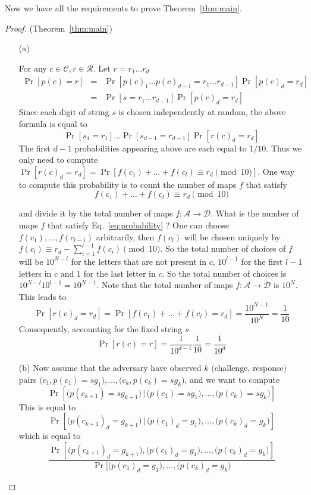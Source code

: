 \documentclass[anon,12pt]{colt2016}
\begin{document}
Now we have all the requirements to prove Theorem~\ref{thm:main}.
\begin{proof}(Theorem~\ref{thm:main})


\begin{itemize}
	\item[(a)]

 For any $c\in\mathcal{C}, r\in\mathcal{R}$. Let $r=r_1\ldots r_d$
	$$
	\begin{array}{lcl}
		\Pr[p(c)=r] & = &
		\Pr[p(c)_1\ldots p(c)_{d-1}=r_1\ldots r_{d-1}]\Pr[p(c)_d=r_d] \\
		& =&
	 \Pr[s=r_1\ldots r_{d-1}]\Pr[p(c)_d=r_d]
	\end{array}
	$$
	Since each digit of string $s$ is chosen independently at random, the above formula is equal to
	$$
	\Pr[s_1=r_1]\ldots \Pr[s_{d-1}=r_{d-1}]\Pr[r(c)_d=r_d]
	$$
	 The first $d-1$ probabilities appearing above are each equal to $1/10$. Thus we only need to compute $\Pr[r(c)_d=r_d]= 
	        \Pr[f(c_1)+\ldots+f(c_{l})\equiv r_d \pmod{10} ]$. One way to compute this probability is to count the number of maps $f$ that satisfy 
	\begin{equation}
		\label{eq:probability}
	        f(c_1)+\ldots+f(c_{l})\equiv r_d \pmod{10}	
	    \end{equation}

	  and divide it by the total number of maps $f:\mathcal{A}\to \mathcal{D}$. What is the number of maps $f$ that satisfy Eq.~\ref{eq:probability} ? One can choose $f(c_1),\ldots ,f(c_{l-1})$ arbitrarily, then $f(c_l)$ will be chosen uniquely by $f(c_l)\equiv r_d-\sum_{i=1}^{l-1}f(c_i)\pmod{10}$. So the total number of choices of $f$ will be $10^{N-{l}}$ for the letters that are not present in $c$, $10^{{l-1}}$ for the first $l-1$ letters in $c$ and 1 for the last letter in $c$. So the total number of choices is $10^{N-l}10^{l-1}=10^{N-1}$. Note that the total number of maps $f:\mathcal{A}\to \mathcal{D}$ is $10^{N}$. This leads to
	$$
	\Pr[r(c)_d=r_d]=\Pr[f(c_1)+\ldots+f(c_l)=r_d]=\dfrac{10^{N-1}}{10^{N}}=\frac{1}{10}
	$$
	Consequently, accounting for the fixed string $s$
	$$
	\Pr[r(c)=r]=\frac{1}{10^{d-1}}\frac{1}{10}=\frac{1}{10^d}
	$$
	
\item[(b)]
	Now assume that the adversary have observed $k$ $($challenge, response$)$ pairs 
	$\big(c_1, p(c_1)=s g_1\big),\ldots,\big(c_k, p(c_k)=s g_k\big)$, and we want to compute
	$$
	\Pr[\big(p(c_{k+1})=s g_{k+1}\big) \, | \, \big(p(c_1)=s g_1\big),\ldots, \big(p(c_k)=s g_k\big)]
	$$
	This is equal to
	$$
	 \Pr[\big(p(c_{k+1})_d=g_{k+1}\big)\, | \, \big(p(c_1)_d=g_1\big),\ldots, \big(p(c_k)_d=g_k\big)]
	 $$
	 which is equal to 
	 \begin{equation}
	 \label{eq:probability}
	 \frac{\Pr[\big(p(c_{k+1})_d=g_{k+1}\big), \big(p(c_1)_d=g_1\big),\ldots, \big(p(c_k)_d=g_k\big)]}{\Pr[\big(p(c_1)_d=g_1\big),\ldots, \big(p(c_k)_d=g_k\big)}	
	 \end{equation}
	 

\end{itemize}
\end{proof}
\end{document}
